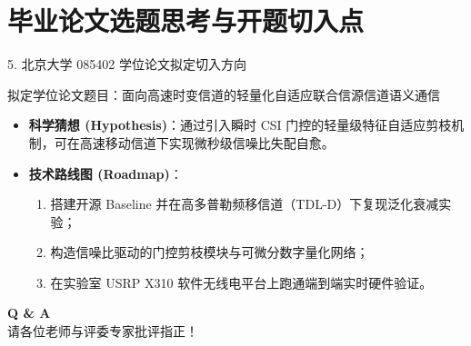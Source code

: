 \documentclass[aspectratio=169,10pt,UTF8]{ctexbeamer}
\begin{document}
\section{毕业论文选题思考与开题切入点}
\begin{frame}{5. 北京大学 085402 学位论文拟定切入方向}
  \begin{block}{拟定学位论文题目：面向高速时变信道的轻量化自适应联合信源信道语义通信}
    \begin{itemize}
      \item \textbf{科学猜想 (Hypothesis)}：通过引入瞬时 CSI 门控的轻量级特征自适应剪枝机制，可在高速移动信道下实现微秒级信噪比失配自愈。
      \item \textbf{技术路线图 (Roadmap)}：
        \begin{enumerate}
          \item 搭建开源 Baseline 并在高多普勒频移信道（TDL-D）下复现泛化衰减实验；
          \item 构造信噪比驱动的门控剪枝模块与可微分数字量化网络；
          \item 在实验室 USRP X310 软件无线电平台上跑通端到端实时硬件验证。
        \end{enumerate}
    \end{itemize}
  \end{block}
\end{frame}

\begin{frame}[plain]
  \begin{center}
    \Huge \textcolor{PkuRed}{\textbf{Q \& A}} \\
    \vspace{0.5cm}
    \normalsize 请各位老师与评委专家批评指正！
  \end{center}
\end{frame}
\end{document}
